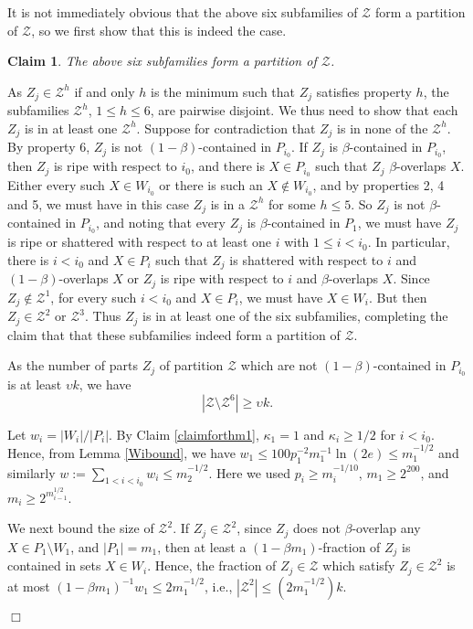 \documentclass[11pt]{article}
\newtheorem{claim}{Claim}[section]
\newenvironment{proof}
      {\medskip\noindent{\bf Proof:}\hspace{1mm}}
      {\hfill$\Box$\medskip}
\begin{document}
\begin{proof}
It is not immediately obvious that the above six subfamilies of $\mathcal{Z}$
form a partition of $\mathcal{Z}$, so we first show that this is indeed the
case.

\begin{claim}\label{claimforthm2}
The above six subfamilies form a partition of $\mathcal{Z}$.
\end{claim}
As $Z_j  \in \mathcal{Z}^h$ if and only $h$ is the minimum such that $Z_j$
satisfies property $h$, the subfamilies $\mathcal{Z}^h$, $1 \leq h \leq 6$, are
pairwise disjoint. We thus need to show that each $Z_j$ is in at least one
$\mathcal{Z}^h$. Suppose for contradiction that $Z_j$ is in none of the
$\mathcal{Z}^h$. By property 6, $Z_j$ is not $(1-\beta)$-contained in
$P_{i_0}$. If $Z_j$ is $\beta$-contained in $P_{i_0}$, then $Z_j$ is ripe with
respect to $i_0$, and there is $X \in P_{i_0}$  such that $Z_j$
$\beta$-overlaps $X$. Either every such $X \in W_{i_0}$ or there is such an $X
\not \in W_{i_0}$, and by properties 2, 4 and 5, we must have in this case
$Z_j$ is in a $\mathcal{Z}^h$ for some $h \leq 5$. So $Z_j$ is not
$\beta$-contained in $P_{i_0}$, and noting that every $Z_j$ is
$\beta$-contained in $P_1$, we must have $Z_j$ is ripe or shattered with
respect to at least one $i$ with $1 \leq i<i_0$. In particular, there is
$i<i_0$ and $X \in P_i$ such that $Z_j$ is shattered with respect to $i$ and
$(1-\beta)$-overlaps $X$ or $Z_j$ is ripe with respect to $i$ and
$\beta$-overlaps $X$. Since $Z_j \not \in \mathcal{Z}^1$, for every such
$i<i_0$ and $X \in P_i$, we must have $X \in W_i$. But then $Z_j \in
\mathcal{Z}^2$ or $\mathcal{Z}^3$. Thus $Z_j$ is in at least one of the six
subfamilies, completing the claim that that these subfamilies indeed form a
partition of $\mathcal{Z}$.

As the number of parts $Z_j$ of partition $\mathcal{Z}$ which are not
$(1-\beta)$-contained in $P_{i_0}$ is at least $\upsilon k$, we have
\begin{equation}\label{up6}
| \mathcal{Z} \setminus \mathcal{Z}^6| \geq \upsilon k.
\end{equation}

Let $w_i=|W_i|/|P_i|$. By Claim \ref{claimforthm1}, $\kappa_1=1$ and $\kappa_i
\geq 1/2$ for $i<i_0$. Hence, from
Lemma \ref{Wibound}, we have $w_1 \leq 100p_1^{-2}m_1^{-1}\ln(2e) \leq
m_1^{-1/2}$ and similarly
$w:=\sum_{1<i<i_0} w_i \leq m_2^{-1/2}$. Here we used $p_i \geq m_i^{-1/10}$,
$m_1 \geq 2^{200}$, and $m_i \geq 2^{m_{i-1}^{1/2}}$.

We next bound the size of $\mathcal{Z}^2$. If $Z_j \in \mathcal{Z}^2$, since
$Z_j$ does not $\beta$-overlap any $X \in P_1 \setminus W_1$, and
$|P_1|=m_1$, then at least a $(1-\beta m_1)$-fraction of $Z_j$ is contained in
sets $X \in W_i$. Hence, the fraction of $Z_j \in \mathcal{Z}$ which
satisfy $Z_j \in \mathcal{Z}^2$ is at most $(1-\beta m_1)^{-1}w_1 \leq
2m_1^{-1/2}$,
i.e., $|\mathcal{Z}^2| \leq (2m_1^{-1/2})k$.


\end{proof}
\end{document}
